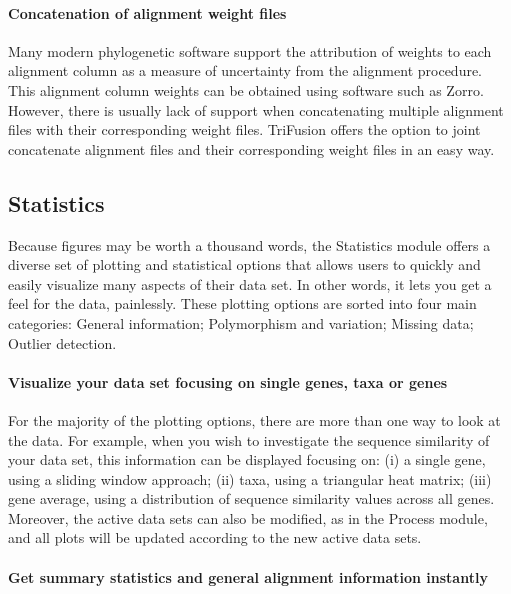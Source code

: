 \documentclass[12pt]{article}
\begin{document}
\paragraph{Concatenation of alignment weight files}

Many modern phylogenetic software support the attribution of weights to each alignment column as a measure of uncertainty from the alignment procedure. This alignment column weights can be obtained using software such as Zorro. However, there is usually lack of support when concatenating multiple alignment files with their corresponding weight files. TriFusion offers the option to joint concatenate alignment files and their corresponding weight files in an easy way. 

\subsection{Statistics}

Because figures may be worth a thousand words, the Statistics module offers a diverse set of plotting and statistical options that allows users to quickly and easily visualize many aspects of their data set. In other words, it lets you get a feel for the data, painlessly. These plotting options are sorted into four main categories: General information; Polymorphism and variation; Missing data; Outlier detection.

\paragraph{Visualize your data set focusing on single genes, taxa or genes}

For the majority of the plotting options, there are more than one way to look at the data. For example, when you wish to investigate the sequence similarity of your data set, this information can be displayed focusing on: (i) a single gene, using a sliding window approach; (ii) taxa, using a triangular heat matrix; (iii) gene average, using a distribution of sequence similarity values across all genes. Moreover, the active data sets can also be modified, as in the Process module, and all plots will be updated according to the new active data sets.

\paragraph{Get summary statistics and general alignment information instantly}
\end{document}
